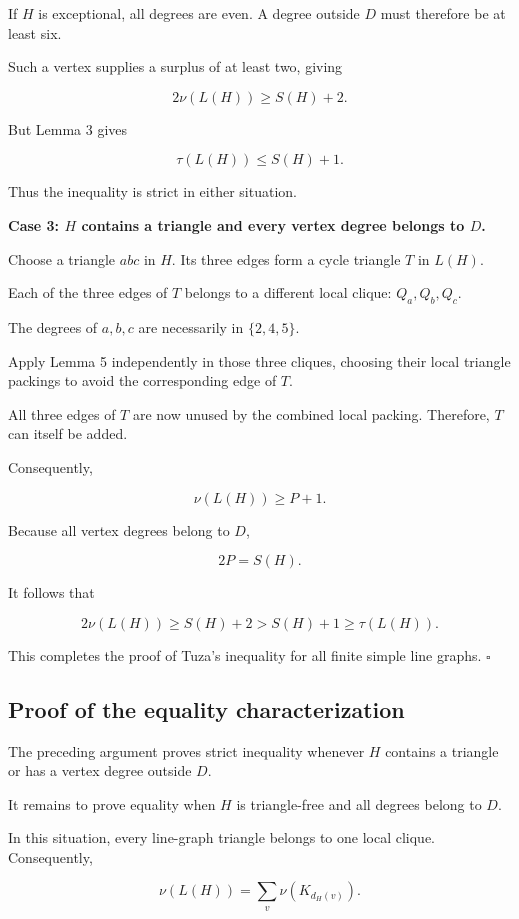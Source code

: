 \documentclass[11pt]{article}
\begin{document}
If \(H\) is exceptional, all degrees are even. A degree outside \(D\) must therefore be at least six.

Such a vertex supplies a surplus of at least two, giving

\[
2\nu(L(H))\geq S(H)+2.
\]

But Lemma 3 gives

\[
\tau(L(H))\leq S(H)+1.
\]

Thus the inequality is strict in either situation.

\textbf{Case 3: \(H\) contains a triangle and every vertex degree belongs to \(D\).}

Choose a triangle \(abc\) in \(H\). Its three edges form a cycle triangle \(T\) in \(L(H)\).

Each of the three edges of \(T\) belongs to a different local clique: \(Q_a,Q_b,Q_c\).

The degrees of \(a,b,c\) are necessarily in \(\{2,4,5\}\).

Apply Lemma 5 independently in those three cliques, choosing their local triangle packings to avoid the corresponding edge of \(T\).

All three edges of \(T\) are now unused by the combined local packing. Therefore, \(T\) can itself be added.

Consequently,

\[
\nu(L(H))\geq P+1.
\]

Because all vertex degrees belong to \(D\),

\[
2P=S(H).
\]

It follows that

\[
2\nu(L(H))\geq S(H)+2
>S(H)+1\geq\tau(L(H)).
\]

This completes the proof of Tuza's inequality for all finite simple line graphs. \(\square\)

\subsection{Proof of the equality characterization}

The preceding argument proves strict inequality whenever \(H\) contains a triangle or has a vertex degree outside \(D\).

It remains to prove equality when \(H\) is triangle-free and all degrees belong to \(D\).

In this situation, every line-graph triangle belongs to one local clique. Consequently,

\[
\nu(L(H))=\sum_v\nu(K_{d_H(v)}).
\]
\end{document}
